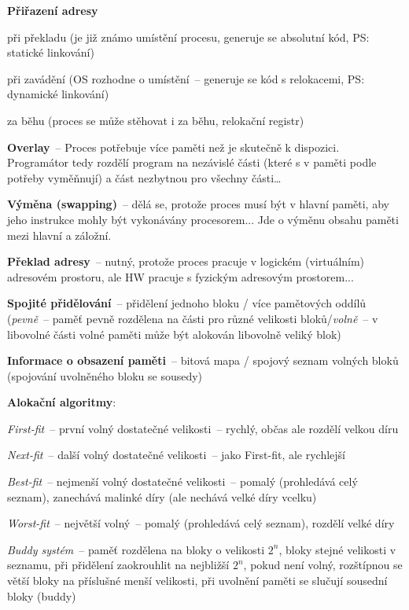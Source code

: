\textbf{Přiřazení adresy}
\begin{pitemize}
	\item při překladu (je již známo umístění procesu, generuje se absolutní kód, PS: statické linkování)
	\item při zavádění (OS rozhodne o umístění~-- generuje se kód s relokacemi, PS: dynamické linkování)
	\item za běhu (proces se může stěhovat i za běhu, relokační registr)
\end{pitemize}

\textbf{Overlay}~-- Proces potřebuje více paměti než je skutečně k dispozici.
Programátor tedy rozdělí program na nezávislé části (které s v paměti podle
potřeby vyměňnují) a část nezbytnou pro všechny části\dots

\textbf{Výměna (swapping)}~-- dělá se, protože proces musí být v hlavní paměti,
aby jeho instrukce mohly být vykonávány procesorem... Jde o výměnu obsahu paměti
mezi hlavní a záložní.

\textbf{Překlad adresy}~-- nutný, protože proces pracuje v logickém (virtuálním) adresovém prostoru, ale HW pracuje s fyzickým adresovým prostorem...

\textbf{Spojité přidělování}~-- přidělení jednoho bloku / více pamětových oddílů (\emph{pevně}~-- paměť pevně rozdělena na části pro různé velikosti bloků/\emph{volně}~-- v libovolné části volné paměti může být alokován libovolně veliký blok)

\textbf{Informace o obsazení paměti}~-- bitová mapa / spojový seznam volných bloků (spojování uvolněného bloku se sousedy)

\textbf{Alokační algoritmy}:
\begin{pitemize}
	\item \emph{First-fit}~-- první volný dostatečné velikosti~-- rychlý, občas ale rozdělí velkou díru
	\item \emph{Next-fit}~-- další volný dostatečné velikosti~-- jako First-fit, ale rychlejší
	\item \emph{Best-fit}~-- nejmenší volný dostatečné velikosti~-- pomalý (prohledává celý seznam), zanechává malinké díry (ale nechává velké díry vcelku)
	\item \emph{Worst-fit}~-- největší volný~-- pomalý (prohledává celý seznam), rozdělí velké díry
	\item \emph{Buddy systém}~-- paměť rozdělena na bloky o velikosti $2^n$, bloky stejné velikosti v seznamu, při přidělení zaokrouhlit na nejbližší $2^n$, pokud není volný, rozštípnou se větší bloky na příslušné menší velikosti, při uvolnění paměti se slučují sousední bloky (buddy)
\end{pitemize}


